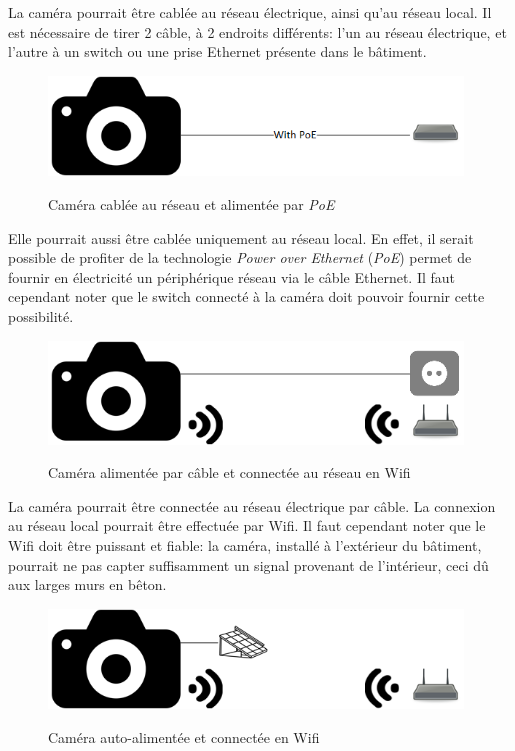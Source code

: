 La caméra pourrait être cablée au réseau électrique, ainsi qu'au réseau local. Il est nécessaire de tirer 2 câble, à 2 endroits différents: l'un au réseau électrique, et l'autre à un switch ou une prise Ethernet présente dans le bâtiment.

\begin{figure}[H]
    \includegraphics[width=110mm]{img/conception/cam_con_2.png}
    \label{fig:capture_cameras}
    \centering
    \caption{Caméra cablée au réseau et alimentée par \textit{PoE}}
\end{figure}

Elle pourrait aussi être cablée uniquement au réseau local. En effet, il serait possible de profiter de la technologie \textit{Power over Ethernet} (\textit{PoE}) permet de fournir en électricité un périphérique réseau via le câble Ethernet. Il faut cependant noter que le switch connecté à la caméra doit pouvoir fournir cette possibilité.

\begin{figure}[H]
    \includegraphics[width=110mm]{img/conception/cam_con_3.png}
    \label{fig:capture_cameras}
    \centering
    \caption{Caméra alimentée par câble et connectée au réseau en Wifi}
\end{figure}

La caméra pourrait être connectée au réseau électrique par câble. La connexion au réseau local pourrait être effectuée par Wifi. Il faut cependant noter que le Wifi doit être puissant et fiable: la caméra, installé à l'extérieur du bâtiment, pourrait ne pas capter suffisamment un signal provenant de l'intérieur, ceci dû aux larges murs en bêton. 

\begin{figure}[H]
    \includegraphics[width=110mm]{img/conception/cam_con_4.png}
    \label{fig:capture_cameras}
    \centering
    \caption{Caméra auto-alimentée et connectée en Wifi}
\end{figure}

